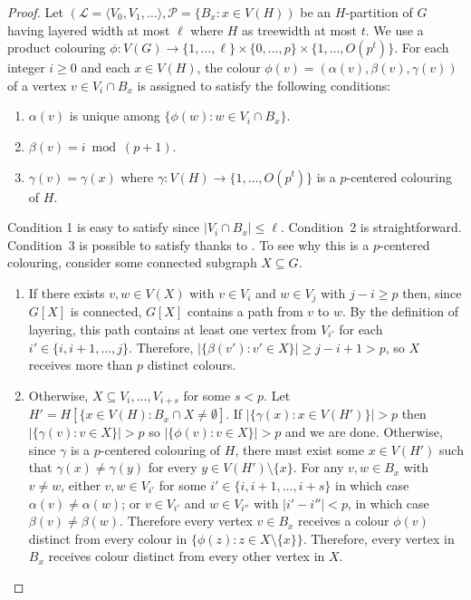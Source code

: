 \documentclass{patmorin}
\begin{document}
\begin{proof}
  Let $(\mathcal{L}=\langle V_0,V_1,\ldots\rangle, \mathcal{P}=\{B_x:x\in V(H))$ be an $H$-partition of $G$ having layered width at most $\ell$ where $H$ as treewidth at most $t$.
  We use a product colouring $\phi:V(G)\to \{1,\ldots,\ell\}\times\{0,\ldots,p\}\times\{1,\ldots,O(p^t)\}$.  For each integer $i\ge 0$ and each $x\in V(H)$, the colour $\phi(v)=(\alpha(v),\beta(v),\gamma(v))$ of a vertex $v\in V_i\cap B_x$ is assigned to satisfy the following conditions:
  \begin{enumerate}
    \item $\alpha(v)$ is unique among $\{\phi(w): w\in V_i\cap B_x\}$.
    
    \item $\beta(v)= i\bmod (p+1)$.
    
    \item $\gamma(v)=\gamma(x)$ where $\gamma:V(H)\to\{1,\ldots,O(p^t)\}$ is a $p$-centered colouring of $H$.
  \end{enumerate}
  Condition 1 is easy to satisfy since $|V_i\cap B_x|\le \ell$.  Condition~2 is straightforward.  Condition~3 is possible to satisfy thanks to .  To see why this is a $p$-centered colouring, consider some connected subgraph $X\subseteq G$.
  \begin{enumerate}
    \item If there exists $v,w\in V(X)$ with $v\in V_i$ and $w\in V_j$ with $j-i\ge p$ then, since $G[X]$ is connected, $G[X]$ contains a path from $v$ to $w$.  By the definition of layering, this path contains at least one vertex from $V_{i'}$ for each $i'\in\{i,i+1,\ldots,j\}$. Therefore, $|\{\beta(v'):v'\in X\}|\ge j-i+1 > p$, so $X$ receives more than $p$ distinct colours.
    
    \item Otherwise, $X\subseteq V_{i},\ldots,V_{i+s}$ for some $s<p$.  Let $H'=H[\{x\in V(H):B_x\cap X\neq\emptyset]$.  If $|\{\gamma(x):x\in V(H')\}| > p$ then $|\{\gamma(v):v\in X\}|> p$ so $|\{\phi(v):v\in X\}|> p$ and we are done.  Otherwise, since $\gamma$ is a $p$-centered colouring of $H$, there must exist some $x\in V(H')$ such that $\gamma(x)\neq\gamma(y)$ for every $y\in V(H')\setminus\{x\}$.
    For any $v,w\in B_x$ with $v\neq w$, either $v,w\in V_{i'}$ for some $i'\in\{i,i+1,\ldots,i+s\}$ in which case $\alpha(v)\neq\alpha(w)$; or $v\in V_{i'}$ and $w\in V_{i''}$ with $|i'-i''|< p$, in which case $\beta(v)\neq\beta(w)$. Therefore every vertex $v\in B_x$ receives a colour $\phi(v)$ distinct from every colour in $\{\phi(z):z\in X\setminus\{x\}\}$. Therefore, every vertex in $B_x$ receives colour distinct from every other vertex in $X$.
  \end{enumerate}
\end{proof}
\end{document}
